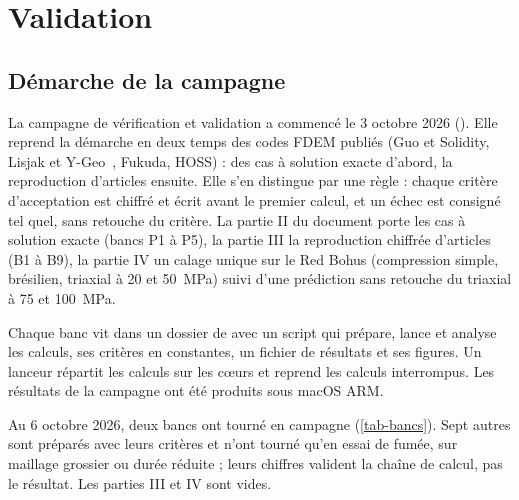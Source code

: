 \section{Validation}
\label{sec-validation}

\subsection{Démarche de la campagne}

La campagne de vérification et validation a commencé le 3 octobre 2026 (). Elle reprend la démarche en deux temps des codes FDEM publiés (Guo et Solidity, Lisjak et Y-Geo~\cite{lisjak2013thesis,mahabadi2012ygeo}, Fukuda, HOSS) : des cas à solution exacte d'abord, la reproduction d'articles ensuite. Elle s'en distingue par une règle : chaque critère d'acceptation est chiffré et écrit avant le premier calcul, et un échec est consigné tel quel, sans retouche du critère. La partie II du document porte les cas à solution exacte (bancs P1 à P5), la partie III la reproduction chiffrée d'articles (B1 à B9), la partie IV un calage unique sur le Red Bohus (compression simple, brésilien, triaxial à 20 et 50~MPa) suivi d'une prédiction sans retouche du triaxial à 75 et 100~MPa.

Chaque banc vit dans un dossier de  avec un script qui prépare, lance et analyse les calculs, ses critères en constantes, un fichier de résultats et ses figures. Un lanceur répartit les calculs sur les cœurs et reprend les calculs interrompus. Les résultats de la campagne ont été produits sous macOS ARM.

Au 6 octobre 2026, deux bancs ont tourné en campagne (\cref{tab-bancs}). Sept autres sont préparés avec leurs critères et n'ont tourné qu'en essai de fumée, sur maillage grossier ou durée réduite ; leurs chiffres valident la chaîne de calcul, pas le résultat. Les parties III et IV sont vides.

